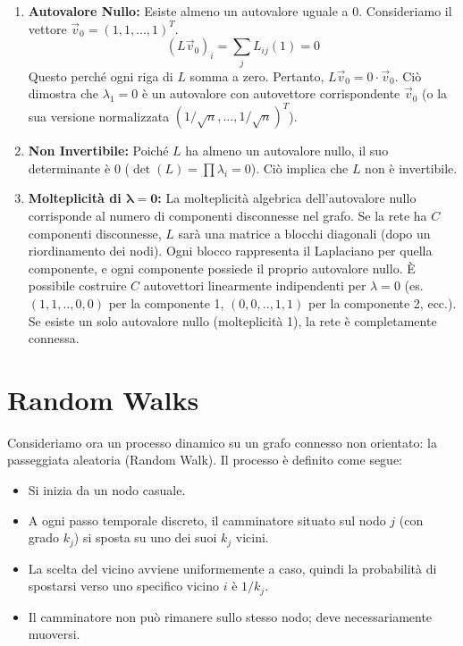 \begin{enumerate}
		
		\item \textbf{Autovalore Nullo:} Esiste almeno un autovalore uguale a 0.
		Consideriamo il vettore $\vec{v}_0 = (1, 1, ..., 1)^T$.
		\begin{equation}
		     (L \vec{v}_0)_i = \sum_{j} L_{ij} (1) = 0
		\end{equation}
       Questo perché ogni riga di $L$ somma a zero.
		Pertanto, $L \vec{v}_0 = 0 \cdot \vec{v}_0$. Ciò dimostra che $\lambda_1 = 0$ è un autovalore con autovettore corrispondente $\vec{v}_0$ (o la sua versione normalizzata $(1/\sqrt{n}, ..., 1/\sqrt{n})^T$).
		
		\item \textbf{Non Invertibile:} Poiché $L$ ha almeno un autovalore nullo, il suo determinante è 0 ($\det(L) = \prod \lambda_i = 0$). Ciò implica che $L$ non è invertibile.
		
		\item \textbf{Molteplicità di $\mathbf{\lambda=0}$:} La molteplicità algebrica dell'autovalore nullo corrisponde al numero di componenti disconnesse nel grafo.
		Se la rete ha $C$ componenti disconnesse, $L$ sarà una matrice a blocchi diagonali (dopo un riordinamento dei nodi). Ogni blocco rappresenta il Laplaciano per quella componente, e ogni componente possiede il proprio autovalore nullo. È possibile costruire $C$ autovettori linearmente indipendenti per $\lambda=0$ (es. $(1,1,..,0,0)$ per la componente 1, $(0,0,..,1,1)$ per la componente 2, ecc.).
		Se esiste un solo autovalore nullo (molteplicità 1), la rete è completamente connessa.
	\end{enumerate}
	
	\section{Random Walks}
	Consideriamo ora un processo dinamico su un grafo connesso non orientato: la passeggiata aleatoria (Random Walk). Il processo è definito come segue:
	\begin{itemize}
		\item Si inizia da un nodo casuale.
		\item A ogni passo temporale discreto, il camminatore situato sul nodo $j$ (con grado $k_j$) si sposta su uno dei suoi $k_j$ vicini.
		\item La scelta del vicino avviene uniformemente a caso, quindi la probabilità di spostarsi verso uno specifico vicino $i$ è $1/k_j$.
		\item Il camminatore non può rimanere sullo stesso nodo; deve necessariamente muoversi.
	\end{itemize}
	

